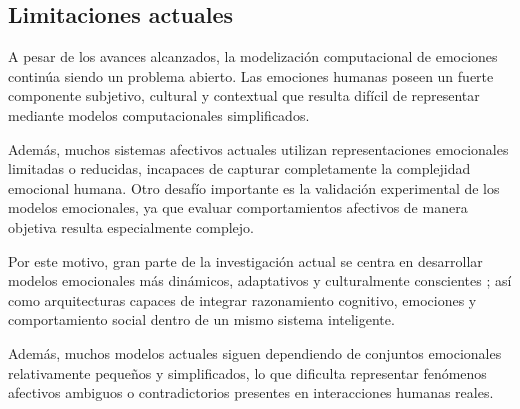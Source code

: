 \subsection{Limitaciones actuales}

A pesar de los avances alcanzados, la modelización computacional de emociones continúa siendo un problema abierto. Las emociones humanas poseen un fuerte componente subjetivo, cultural y contextual que resulta difícil de representar mediante modelos computacionales simplificados.

Además, muchos sistemas afectivos actuales utilizan representaciones emocionales limitadas o reducidas, incapaces de capturar completamente la complejidad emocional humana. Otro desafío importante es la validación experimental de los modelos emocionales, ya que evaluar comportamientos afectivos de manera objetiva resulta especialmente complejo.

Por este motivo, gran parte de la investigación actual se centra en desarrollar modelos emocionales más dinámicos, adaptativos y culturalmente conscientes \cite{taverner2021fuzzy,taverner2023multidimensional}; así como arquitecturas capaces de integrar razonamiento cognitivo, emociones y comportamiento social dentro de un mismo sistema inteligente.

Además, muchos modelos actuales siguen dependiendo de conjuntos emocionales relativamente pequeños y simplificados, lo que dificulta representar fenómenos afectivos ambiguos o contradictorios presentes en interacciones humanas reales.
